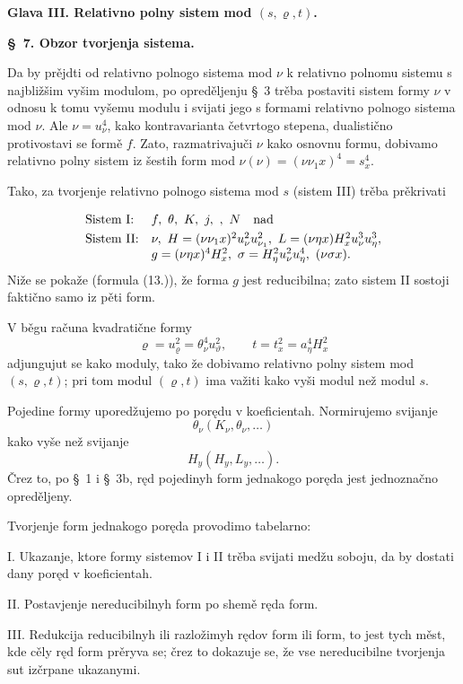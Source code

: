\documentclass[11pt]{article}
\let\A\relax
\newcommand{\A}{\mathfrak A}
\begin{document}
\begin{center}
\textbf{Glava III. \quad Relativno polny sistem mod $(s,\varrho,t)$.}
\end{center}

\begin{center}
\textbf{\S\ 7. \quad Obzor tvorjenja sistema.}
\end{center}

Da by prějdti od relativno polnogo sistema mod $\nu$ k relativno polnomu sistemu s najbližšim vyšim modulom, po opreděljenju \S\ 3 trěba postaviti sistem formy $\nu$ v odnosu k tomu vyšemu modulu i svijati jego s formami relativno polnogo sistema mod $\nu$. Ale $\nu=u_\nu^4$, kako kontravarianta četvrtogo stepena, dualistično protivostavi se formě $f$. Zato, razmatrivajuči $\nu$ kako osnovnu formu, dobivamo relativno polny sistem iz šestih form mod $\nu(\nu)=(\nu\nu_1x)^4=s_x^4$.

Tako, za tvorjenje relativno polnogo sistema mod $s$ (sistem III) trěba prěkrivati
\[
\begin{array}{ll}
\text{Sistem I:} & f,\ \theta,\ K,\ j,\ \A,\ N\quad \text{nad}\vphantom{\dfrac11}\\[0.3em]
\text{Sistem II:} & \nu,\ H=(\nu\nu_1x)^2u_\nu^2u_{\nu_1}^2,\ L=(\nu\eta x)H_x^2u_\nu^3u_\eta^3,\\
& g=(\nu\eta x)^4H_x^2,\ \sigma=H_\eta^2u_\nu^2u_\eta^4,\ (\nu\sigma x).
\end{array}
\]
Niže se pokaže (formula (13.)), že forma $g$ jest reducibilna; zato sistem II sostoji faktično samo iz pěti form.

V běgu računa kvadratične formy
\[
\varrho=u_\varrho^2=\theta_\nu^4u_\vartheta^2,
\qquad
 t=t_x^2=a_\eta^4H_x^2
\]
adjungujut se kako moduly, tako že dobivamo relativno polny sistem mod $(s,\varrho,t)$; pri tom modul $(\varrho,t)$ ima važiti kako vyši modul než modul $s$.

Pojedine formy uporedžujemo po porędu v koeficientah. Normirujemo svijanje
\[
\theta_\nu(K_\nu,\theta_\nu,\ldots)
\]
kako vyše než svijanje
\[
H_y(H_y,L_y,\ldots).
\]
Črez to, po \S\ 1 i \S\ 3b, ręd pojedinyh form jednakogo poręda jest jednoznačno opreděljeny.

Tvorjenje form jednakogo poręda provodimo tabelarno:

I. Ukazanje, ktore formy sistemov I i II trěba svijati medžu soboju, da by dostati dany poręd v koeficientah.

II. Postavjenje nereducibilnyh form po shemě ręda form.

III. Redukcija reducibilnyh ili razložimyh rędov form ili form, to jest tych měst, kde cěly ręd form prěryva se; črez to dokazuje se, že vse nereducibilne tvorjenja sut izčrpane ukazanymi.
\end{document}
